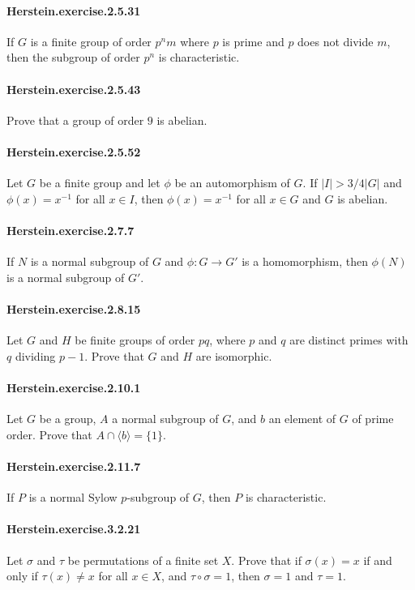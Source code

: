 \documentclass{article}
\begin{document}
\paragraph{Herstein.exercise.2.5.31} If $G$ is a finite group of order $p^nm$ where $p$ is prime and $p$ does not divide $m$, then the subgroup of order $p^n$ is characteristic.

\paragraph{Herstein.exercise.2.5.43} Prove that a group of order $9$ is abelian.

\paragraph{Herstein.exercise.2.5.52} Let $G$ be a finite group and let $\phi$ be an automorphism of $G$. If $|I|>3/4|G|$ and $\phi(x)=x^{-1}$ for all $x\in I$, then $\phi(x)=x^{-1}$ for all $x\in G$ and $G$ is abelian.

\paragraph{Herstein.exercise.2.7.7} If $N$ is a normal subgroup of $G$ and $\phi:G\to G'$ is a homomorphism, then $\phi(N)$ is a normal subgroup of $G'$.

\paragraph{Herstein.exercise.2.8.15} Let $G$ and $H$ be finite groups of order $pq$, where $p$ and $q$ are distinct primes with $q$ dividing $p-1$. Prove that $G$ and $H$ are isomorphic.

\paragraph{Herstein.exercise.2.10.1} Let $G$ be a group, $A$ a normal subgroup of $G$, and $b$ an element of $G$ of prime order. Prove that $A\cap \langle b\rangle = \{1\}$.

\paragraph{Herstein.exercise.2.11.7} If $P$ is a normal Sylow $p$-subgroup of $G$, then $P$ is characteristic.

\paragraph{Herstein.exercise.3.2.21} Let $\sigma$ and $\tau$ be permutations of a finite set $X$. Prove that if $\sigma(x)=x$ if and only if $\tau(x)\neq x$ for all $x\in X$, and $\tau\circ\sigma=1$, then $\sigma=1$ and $\tau=1$.
\end{document}
